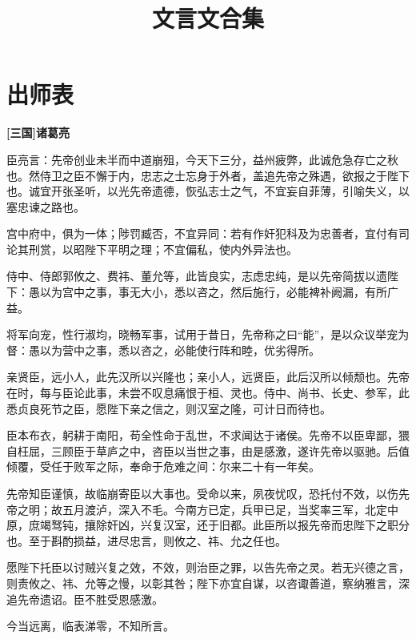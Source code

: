 \documentclass[UTF8,titlepage,oneside]{ctexbook}
\title{\Huge \textbf{文言文合集}}
\date{}
\begin{document}
\maketitle

\tableofcontents

\newpage



\chapter*{出师表}
\begin{center}
	\textbf{[三国]诸葛亮}
\end{center}


臣亮言：先帝创业未半而中道崩殂，今天下三分，益州疲弊，此诚危急存亡之秋也。然侍卫之臣不懈于内，忠志之士忘身于外者，盖追先帝之殊遇，欲报之于陛下也。诚宜开张圣听，以光先帝遗德，恢弘志士之气，不宜妄自菲薄，引喻失义，以塞忠谏之路也。


宫中府中，俱为一体；陟罚臧否，不宜异同：若有作奸犯科及为忠善者，宜付有司论其刑赏，以昭陛下平明之理；不宜偏私，使内外异法也。


侍中、侍郎郭攸之、费祎、董允等，此皆良实，志虑忠纯，是以先帝简拔以遗陛下：愚以为宫中之事，事无大小，悉以咨之，然后施行，必能裨补阙漏，有所广益。


将军向宠，性行淑均，晓畅军事，试用于昔日，先帝称之曰“能”，是以众议举宠为督：愚以为营中之事，悉以咨之，必能使行阵和睦，优劣得所。


亲贤臣，远小人，此先汉所以兴隆也；亲小人，远贤臣，此后汉所以倾颓也。先帝在时，每与臣论此事，未尝不叹息痛恨于桓、灵也。侍中、尚书、长史、参军，此悉贞良死节之臣，愿陛下亲之信之，则汉室之隆，可计日而待也。


臣本布衣，躬耕于南阳，苟全性命于乱世，不求闻达于诸侯。先帝不以臣卑鄙，猥自枉屈，三顾臣于草庐之中，咨臣以当世之事，由是感激，遂许先帝以驱驰。后值倾覆，受任于败军之际，奉命于危难之间：尔来二十有一年矣。


先帝知臣谨慎，故临崩寄臣以大事也。受命以来，夙夜忧叹，恐托付不效，以伤先帝之明；故五月渡泸，深入不毛。今南方已定，兵甲已足，当奖率三军，北定中原，庶竭驽钝，攘除奸凶，兴复汉室，还于旧都。此臣所以报先帝而忠陛下之职分也。至于斟酌损益，进尽忠言，则攸之、祎、允之任也。


愿陛下托臣以讨贼兴复之效，不效，则治臣之罪，以告先帝之灵。若无兴德之言，则责攸之、祎、允等之慢，以彰其咎；陛下亦宜自谋，以咨诹善道，察纳雅言，深追先帝遗诏。臣不胜受恩感激。


今当远离，临表涕零，不知所言。
\end{document}

